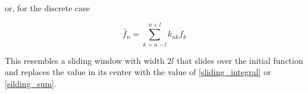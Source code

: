 \documentclass[11pt]{book}
\begin{document}
or, for the discrete case

\begin{equation}
\tilde{f_n} = \sum\limits_{k= n-l}^{n+l} k_{nk}f_k\label{silding_sum}
\end{equation}

This resembles a sliding window with width $2l$ that slides over the initial function and replaces the value in its center with the value  of \eqref{sliding_integral} or \eqref{silding_sum}.





\backmatter
\end{document}
